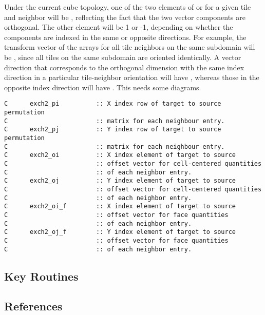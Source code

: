 Under the current cube topology, one of the two elements of
 or  for a given tile  and
neighbor  will be , reflecting the fact that the two
vector components are orthogonal.  The other element will be 1 or -1,
depending on whether the components are indexed in the same or
opposite directions.  For example, the transform vector of the arrays
for all tile neighbors on the same subdomain will be ,
since all tiles on the same subdomain are oriented identically.  A
vector direction that corresponds to the orthogonal dimension with the
same index direction in a particular tile-neighbor orientation will
have , whereas those in the opposite index direction will
have .  This needs some diagrams.


{\footnotesize
\begin{verbatim}
C      exch2_pi          :: X index row of target to source permutation 
C                        :: matrix for each neighbour entry.            
C      exch2_pj          :: Y index row of target to source permutation 
C                        :: matrix for each neighbour entry.            
C      exch2_oi          :: X index element of target to source 
C                        :: offset vector for cell-centered quantities  
C                        :: of each neighbor entry.                     
C      exch2_oj          :: Y index element of target to source 
C                        :: offset vector for cell-centered quantities  
C                        :: of each neighbor entry.                     
C      exch2_oi_f        :: X index element of target to source 
C                        :: offset vector for face quantities           
C                        :: of each neighbor entry.                     
C      exch2_oj_f        :: Y index element of target to source 
C                        :: offset vector for face quantities           
C                        :: of each neighbor entry.                     
\end{verbatim}
}



\subsection{Key Routines}



\subsection{References}
